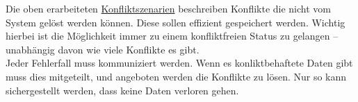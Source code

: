 Die oben erarbeiteten \hyperref[sec:konfliktszenarien]{Konfliktszenarien} beschreiben Konflikte die nicht vom System gelöst werden können.
Diese sollen effizient gespeichert werden. Wichtig hierbei ist die Möglichkeit immer zu einem konfliktfreien Status zu gelangen -- unabhängig davon wie viele Konflikte es gibt.\\
Jeder Fehlerfall muss kommuniziert werden. Wenn es konliktbehaftete Daten gibt muss dies mitgeteilt, und angeboten werden die Konflikte zu lösen. Nur so kann sichergestellt werden, dass keine Daten verloren gehen.
